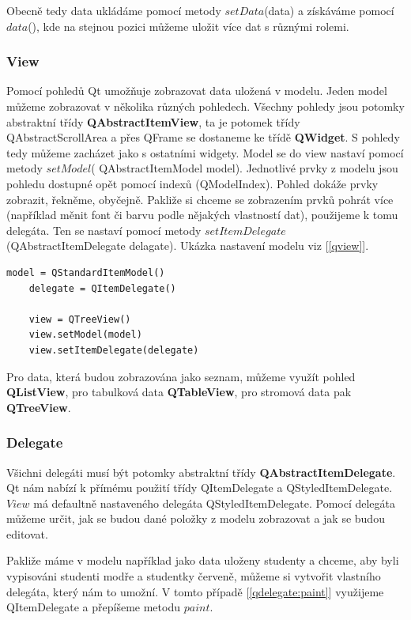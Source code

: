 Obecně tedy data ukládáme pomocí metody $setData$(data) a získáváme
pomocí $data$(), kde na stejnou pozici můžeme uložit více dat s
různými rolemi.
 
\subsubsection*{View}

Pomocí pohledů Qt umožňuje zobrazovat data uložená v modelu. Jeden model můžeme zobrazovat v několika různých pohledech. Všechny pohledy jsou potomky abstraktní třídy \textbf{QAbstractItemView}, ta je potomek třídy QAbstractScrollArea a přes QFrame se dostaneme ke třídě \textbf{QWidget}. S pohledy tedy můžeme zacházet jako s ostatními widgety. Model se do view nastaví pomocí metody $setModel$( QAbstractItemModel model). Jednotlivé prvky z modelu jsou pohledu dostupné opět pomocí indexů (QModelIndex). Pohled dokáže prvky zobrazit, řekněme, obyčejně. Pakliže si chceme se zobrazením prvků pohrát více (například měnit font či barvu podle nějakých vlastností dat), použijeme k tomu delegáta. Ten se nastaví pomocí metody $setItemDelegate$(QAbstractItemDelegate delagate). Ukázka nastavení modelu viz [\autoref{qview}]. \\

\begin{lstlisting}[label=qview,caption={View - vytvoření pohledu a nastavení modelu a delegáta}, morekeywords={QItemDelegate, QStandardItemModel, QTreeView}]
	model = QStandardItemModel()
	delegate = QItemDelegate()

	view = QTreeView()
	view.setModel(model)
	view.setItemDelegate(delegate)
\end{lstlisting}

Pro data, která budou zobrazována jako seznam, můžeme využít
pohled \textbf{QListView}, pro tabulková data \textbf{QTableView}, pro
stromová data pak \textbf{QTreeView}.

\subsubsection*{Delegate}
Všichni delegáti musí být potomky abstraktní
třídy \textbf{QAbstractItemDelegate}. Qt nám nabízí k přímému použití
třídy QItemDelegate a QStyledItemDelegate. $View$ má defaultně
nastaveného delegáta QStyledItemDelegate. Pomocí delegáta můžeme
určit, jak se budou dané položky z modelu zobrazovat a jak se budou
editovat.

Pakliže máme v modelu například jako data uloženy studenty a chceme,
aby byli vypisováni studenti modře a studentky červeně, můžeme si
vytvořit vlastního delegáta, který nám to umožní. V tomto případě
[\lstlistingname \ref{qdelegate:paint}] využijeme QItemDelegate a
přepíšeme metodu $paint$. \\

